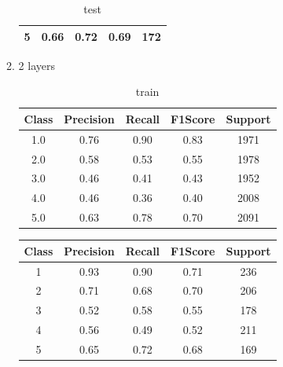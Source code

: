 \begin{enumerate}[label=(\alph*)]
\begin{enumerate}[label=\roman*.]
\begin{table}[!htb]
\begin{tabular}{ccccc}
                            5     & 0.66      & 0.72   & 0.69    & 172     \\ \hline
                        \end{tabular}
                        \caption{test}
                        \label{part f test depth 1}
                    \end{table}
                    \newpage
              \item 2 layers
                    \begin{table}[!htb]
                        \centering
                        \begin{tabular}{ccccc}
                            \hline
                            Class & Precision & Recall & F1Score & Support \\ \hline
                            1.0   & 0.76      & 0.90   & 0.83    & 1971    \\
                            2.0   & 0.58      & 0.53   & 0.55    & 1978    \\
                            3.0   & 0.46      & 0.41   & 0.43    & 1952    \\
                            4.0   & 0.46      & 0.36   & 0.40    & 2008    \\
                            5.0   & 0.63      & 0.78   & 0.70    & 2091    \\ \hline
                        \end{tabular}
                        \caption{train}
                        \label{part f train depth 2}
                    \end{table}
                    \begin{table}[!htb]
                        \centering
                        \begin{tabular}{ccccc}
                            \hline
                            Class & Precision & Recall & F1Score & Support \\ \hline
                            1     & 0.93      & 0.90   & 0.71    & 236     \\
                            2     & 0.71      & 0.68   & 0.70    & 206     \\
                            3     & 0.52      & 0.58   & 0.55    & 178     \\
                            4     & 0.56      & 0.49   & 0.52    & 211     \\
                            5     & 0.65      & 0.72   & 0.68    & 169     \\ \hline

\end{tabular}
\end{table}
\end{enumerate}
\end{enumerate}
